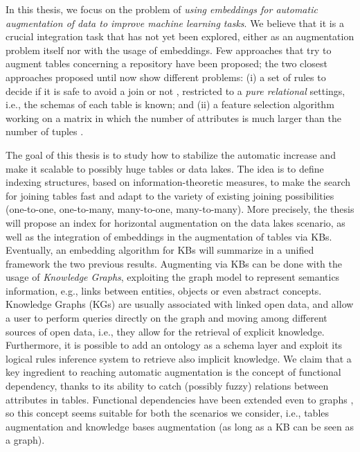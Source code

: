 In this thesis, we focus on the problem of \textit{using embeddings for automatic augmentation of data to improve machine learning tasks}. We believe that it is a crucial integration task that has not yet been explored, either as an augmentation problem itself nor with the usage of embeddings. Few approaches that try to augment tables concerning a repository have been proposed; the two closest approaches proposed until now show different problems: (i) a set of rules to decide if it is safe to avoid a join or not \cite{kumar2016join}, restricted to a \textit{pure relational} settings, i.e., the schemas of each table is known; and (ii) a feature selection algorithm working on a matrix in which the number of attributes is much larger than the number of tuples \cite{chepurko2020arda}. 

The goal of this thesis is to study how to stabilize the automatic increase and make it scalable to possibly huge tables or data lakes. The idea is to define indexing structures, based on information-theoretic measures, to make the search for joining tables fast and adapt to the variety of existing joining possibilities (one-to-one, one-to-many, many-to-one, many-to-many). More precisely, the thesis will propose an index for horizontal augmentation on the data lakes scenario, as well as the integration of embeddings in the augmentation of tables via KBs. Eventually, an embedding algorithm for KBs will summarize in a unified framework the two previous results. Augmenting via KBs can be done with the usage of \textit{Knowledge Graphs}, exploiting the graph model to represent semantics information, e.g., links between entities, objects or even abstract concepts. Knowledge Graphs (KGs) are usually associated with linked open data, and allow a user to perform queries directly on the graph and moving among different sources of open data, i.e., they allow for the retrieval of explicit knowledge. Furthermore, it is possible to add an ontology as a schema layer and exploit its logical rules inference system to retrieve also implicit knowledge.
We claim that a key ingredient to reaching automatic augmentation is the concept of functional dependency, thanks to its ability to catch (possibly fuzzy) relations between attributes in tables. Functional dependencies have been extended even to graphs \cite{fan2016functional}, so this concept seems suitable for both the scenarios we consider, i.e., tables augmentation and knowledge bases augmentation (as long as a KB can be seen as a graph). 


